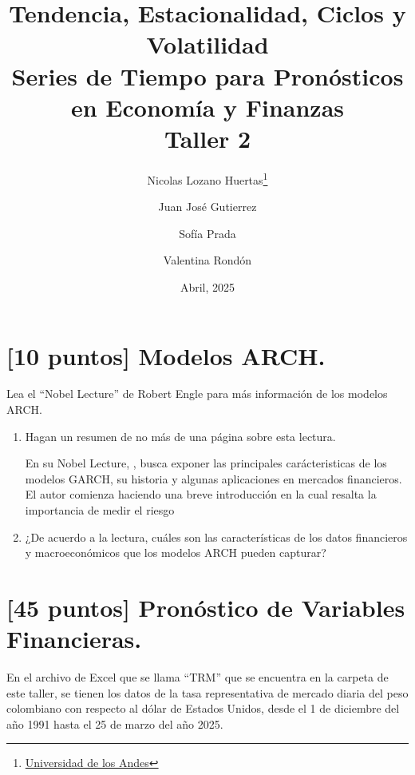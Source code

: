\documentclass{article}
\title{\textbf{Tendencia, Estacionalidad, Ciclos y Volatilidad} \\ {\Large Series de Tiempo para Pron\'osticos en Econom\'ia y Finanzas} \\ {\large Taller 2}}
\author{Nicolas Lozano Huertas\thanks{\href{mailto:n.lozanoh@uniandes.edu.co?subject= Taller 2 Series de Tiempo}{Universidad de los Andes}} \and Juan José Gutierrez \and Sof\'ia Prada \and Valentina Rond\'on}
\date{Abril, 2025}
\theoremstyle{remark}
\theoremstyle{definition}
\begin{document}
\maketitle
\vspace{-1 cm}
\section{[10 puntos] Modelos ARCH.}
{Lea el ``Nobel Lecture'' de Robert Engle para m\'as informaci\'on de los modelos ARCH.}
\begin{enumerate}[label = \emph{\alph*})]
    \item {Hagan un resumen de no m\'as de una p\'agina sobre esta lectura.}
        \begin{tcolorbox}[title=Soluci\'on 1.a]
            En su Nobel Lecture, \cite{engle2004}, busca exponer las principales car\'acteristicas de los modelos GARCH, su historia y algunas aplicaciones en mercados financieros. \\
            El autor comienza haciendo una breve introducci\'on en la cual resalta la importancia de medir el riesgo 
        \end{tcolorbox}
    \item {¿De acuerdo a la lectura, cu\'ales son las caracter\'isticas de los datos financieros y macroecon\'omicos que los modelos ARCH pueden capturar?}
        \begin{tcolorbox}[title=Soluci\'on 1.b]
            
        \end{tcolorbox}
\end{enumerate}

\section{[45 puntos] Pron\'ostico de Variables Financieras.}

{En el archivo de Excel que se llama ``TRM'' que se encuentra en la carpeta de este taller, se tienen los datos de la tasa representativa de mercado diaria del peso colombiano con respecto al d\'olar de Estados Unidos, desde el 1 de diciembre del año 1991 hasta el 25 de marzo del año 2025.}
\end{document}
